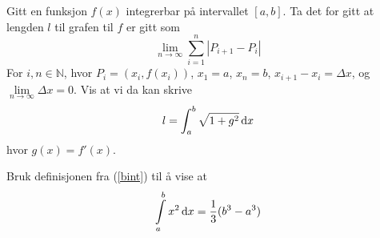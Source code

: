 \newpage
{}
Gitt en funksjon $ f(x) $ integrerbar på intervallet $ [a, b] $. Ta det for gitt at lengden $ l $ til grafen til $ f $ er gitt som
\[ \lim_{n\to \infty}\sum\limits_{i=1}^n \left|P_{i+1}-P_i\right| \]
For $ i,n\in\mathbb{N} $, hvor $ P_i =(x_i, f(x_i)) $, $ x_1=a $, $ x_n=b $, $ x_{i+1}-x_i=\Delta x $, og $ \lim\limits_{n\to\infty}\Delta x=0 $.
Vis at vi da kan skrive
\[ l=\int_{a}^{b} \sqrt{1+g^2}\,\text{d}x \]
hvor $ g(x)=f'(x) $.

Bruk definisjonen fra (\ref{bint}) til å vise at
\[ \int\limits_a^b x^2 \,\text{d}x = \frac{1}{3}(b^3-a^3) \]

